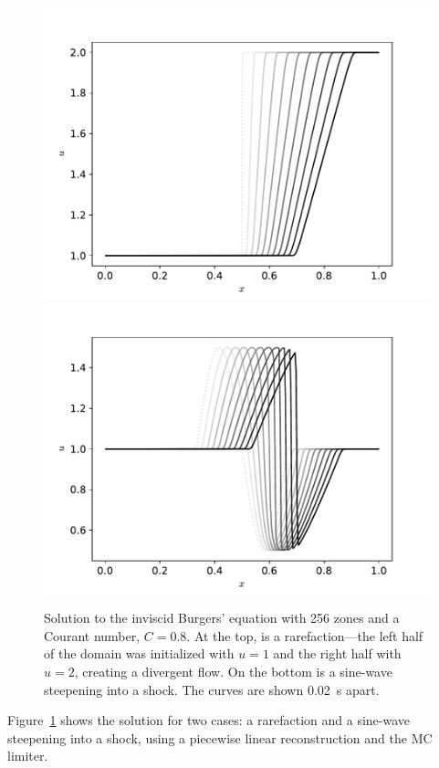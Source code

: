 \begin{figure}[t]
\centering
\includegraphics[width=0.8\linewidth]{fv-burger-rarefaction} \\
\includegraphics[width=0.8\linewidth]{fv-burger-sine}
\caption[Solutions to the inviscid Burgers'
  equation]{\label{fig:burgers} Solution to the inviscid Burgers'
  equation with 256 zones and a Courant number, $C = 0.8$.  At the
  top, is a rarefaction---the left half of the domain was initialized
  with $u = 1$ and the right half with $u = 2$, creating a divergent
  flow.  On the bottom is a sine-wave steepening into a shock.  The
  curves are shown 0.02~s apart. \\
  }
\end{figure}

Figure~\ref{fig:burgers} shows the solution for two cases: a rarefaction
and a sine-wave steepening into a shock, using a piecewise linear
reconstruction and the MC limiter.

